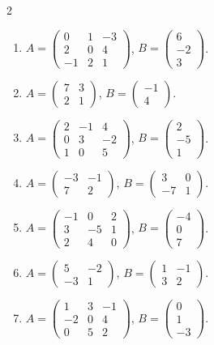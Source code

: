 \begin{multicols}{2}
\begin{enumerate}[label=\arabic*.,  leftmargin=*]
\item $A=\begin{pmatrix}0&1&-3\\2&0&4\\-1&2&1\end{pmatrix}$, $B=\begin{pmatrix}6\\-2\\3\end{pmatrix}$.
\item $A=\begin{pmatrix}7&3\\2&1\end{pmatrix}$, $B=\begin{pmatrix}-1\\4\end{pmatrix}$.
\item $A=\begin{pmatrix}2&-1&4\\0&3&-2\\1&0&5\end{pmatrix}$, $B=\begin{pmatrix}2\\-5\\1\end{pmatrix}$.
\item $A=\begin{pmatrix}-3&-1\\7&2\end{pmatrix}$, $B=\begin{pmatrix}3&0\\-7&1\end{pmatrix}$.
\item $A=\begin{pmatrix}-1&0&2\\3&-5&1\\2&4&0\end{pmatrix}$, $B=\begin{pmatrix}-4\\0\\7\end{pmatrix}$.
\item $A=\begin{pmatrix}5&-2\\-3&1\end{pmatrix}$, $B=\begin{pmatrix}1&-1\\3&2\end{pmatrix}$.
\item $A=\begin{pmatrix}1&3&-1\\-2&0&4\\0&5&2\end{pmatrix}$, $B=\begin{pmatrix}0\\1\\-3\end{pmatrix}$.

\end{enumerate}
\end{multicols}
